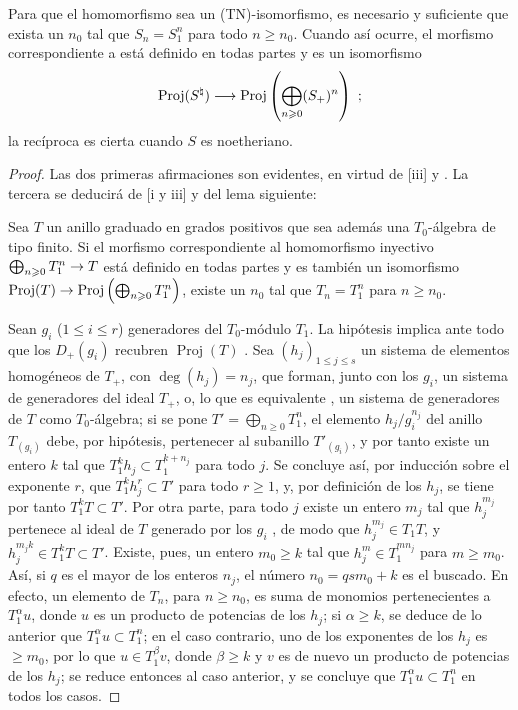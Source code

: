 \documentclass[oneside,10pt]{amsart}
\makeatletter
\renewcommand{\leq}{\leqslant}
\renewcommand{\geq}{\geqslant}
\newcommand{\ega@arrow}[2]{\mathchoice{#1}{#2}{#2}{#2}}
\renewcommand{\to}{\ega@arrow{\longrightarrow}{\rightarrow}}
\newcommand{\oldpage}[2][]{\marginnote{\normalfont\footnotesize\textbf{#1}~|~#2}\ignorespaces}
\let\EGAOriginalLabel\label
\renewcommand{\label}[1]{\phantomsection\EGAOriginalLabel{#1}}
\makeatother
\begin{document}
\begin{proposition}[8.2.14]
\label{II.8.2.14-fr}
Para que el homomorfismo  sea un \textup{(TN)}-isomorfismo, es necesario y suficiente que exista un $n_0$ tal que $S_n=S_1^n$ para todo $n\geq n_0$.
Cuando así ocurre, el morfismo correspondiente a  está definido en todas partes y es un isomorfismo
\[
  \operatorname{Proj}(S^{\natural})\to
  \operatorname{Proj}\left(\bigoplus_{n\geq0}(S_+)^n\right)~;
\]
la recíproca es cierta cuando $S$ es noetheriano.
\end{proposition}

\begin{proof}
Las dos primeras afirmaciones son evidentes, en virtud de [iii] y .
La tercera se deducirá de [i y iii] y del lema siguiente:
\begin{lemma}[8.2.14.1]
\label{II.8.2.14.1-fr}
Sea $T$ un anillo graduado en grados positivos que sea además una $T_0$-álgebra de tipo finito.
Si el morfismo correspondiente al homomorfismo inyectivo $\bigoplus_{n\geq0}T_1^n\to T$ está definido en todas partes y es también un isomorfismo $\operatorname{Proj}(T)\to\operatorname{Proj}\left(\bigoplus_{n\geq0}T_1^n\right)$, existe un $n_0$ tal que $T_n=T_1^n$ para $n\geq n_0$.
\end{lemma}

Sean $g_i$ ($1\leq i\leq r$) generadores del $T_0$-módulo $T_1$.
La hipótesis implica ante todo que los $D_+(g_i)$ recubren $\operatorname{Proj}(T)$ .
Sea $(h_j)_{1\leq j\leq s}$ un sistema de elementos homogéneos de $T_+$, con $\deg(h_j)=n_j$, que forman, junto con los $g_i$, un sistema de generadores del ideal $T_+$, o, lo que es equivalente , un sistema de generadores de $T$ como $T_0$-álgebra;
si se pone $T'=\bigoplus_{n\geq0}T_1^n$, el elemento $h_j/g_i^{n_j}$ del anillo $T_{(g_i)}$ debe, por hipótesis, pertenecer al subanillo $T'_{(g_i)}$, y por tanto existe un entero $k$ tal que $T_1^k h_j\subset T_1^{k+n_j}$ para todo $j$.
Se concluye así, por inducción sobre el exponente $r$, que $T_1^k h_j^r\subset T'$ para todo $r\geq1$, y, por definición de los $h_j$, se tiene por tanto $T_1^kT\subset T'$.
Por otra parte, para todo $j$ existe un entero $m_j$ tal que $h_j^{m_j}$ pertenece al ideal de $T$ generado por los $g_i$ , de modo que $h_j^{m_j}\in T_1T$, y
\oldpage[II]{162}
$h_j^{m_jk}\in T_1^kT\subset T'$.
Existe, pues, un entero $m_0\geq k$ tal que $h_j^m\in T_1^{mn_j}$ para $m\geq m_0$.
Así, si $q$ es el mayor de los enteros $n_j$, el número $n_0=qsm_0+k$ es el buscado.
En efecto, un elemento de $T_n$, para $n\geq n_0$, es suma de monomios pertenecientes a $T_1^\alpha u$, donde $u$ es un producto de potencias de los $h_j$;
si $\alpha\geq k$, se deduce de lo anterior que $T_1^\alpha u\subset T_1^n$;
en el caso contrario, uno de los exponentes de los $h_j$ es $\geq m_0$, por lo que $u\in T_1^\beta v$, donde $\beta\geq k$ y $v$ es de nuevo un producto de potencias de los $h_j$;
se reduce entonces al caso anterior, y se concluye que $T_1^\alpha u\subset T_1^n$ en todos los casos.
\end{proof}
\end{document}
